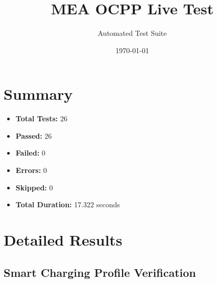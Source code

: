 \documentclass{article}
\title{MEA OCPP Live Test}
\author{Automated Test Suite}
\date{\today}
\begin{document}
\maketitle

\section{Summary}
\begin{itemize}
    \item \textbf{Total Tests:} 26
    \item \textbf{Passed:} 26
    \item \textbf{Failed:} 0
    \item \textbf{Errors:} 0
    \item \textbf{Skipped:} 0
    \item \textbf{Total Duration:} 17.322 seconds
\end{itemize}

\section{Detailed Results}
\subsection{Smart Charging Profile Verification}
\end{document}
